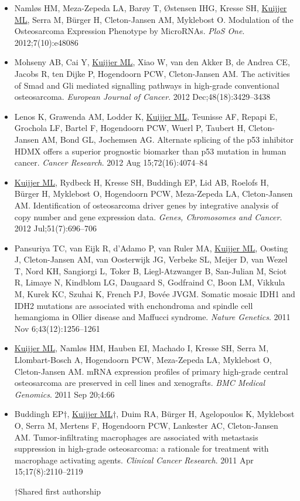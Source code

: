 \begin{itemize}
	\item Naml{\o}s HM, Meza-Zepeda LA, Bar{\o}y T, {\O}stensen IHG, Kresse SH, \underline{Kuijjer ML}, Serra M, B{\"u}rger H, Cleton-Jansen AM, Myklebost O. Modulation of the Osteosarcoma Expression Phenotype by MicroRNAs. {\it PloS One}. 2012;7(10):e48086
	\item Mohseny AB, Cai Y, \underline{Kuijjer ML}, Xiao W, van den Akker B, de Andrea CE, Jacobs R, ten Dijke P, Hogendoorn PCW, Cleton-Jansen AM. The activities of Smad and Gli mediated signalling pathways in high\hyp{}grade conventional osteosarcoma. {\it European Journal of Cancer}. 2012 Dec;48(18):3429--3438
	\item Lenos K, Grawenda AM, Lodder K, \underline{Kuijjer ML}, Teunisse AF, Repapi E, Grochola LF, Bartel F, Hogendoorn PCW, Wuerl P, Taubert H, Cleton-Jansen AM, Bond GL, Jochemsen AG. Alternate splicing of the p53 inhibitor HDMX offers a superior prognostic biomarker than p53 mutation in human cancer. {\it Cancer Research}. 2012 Aug 15;72(16):4074--84
	\item \underline{Kuijjer ML}, Rydbeck H, Kresse SH, Buddingh EP, Lid AB, Roelofs H, B{\"u}rger H, Myklebost O, Hogendoorn PCW, Meza-Zepeda LA, Cleton-Jansen AM. Identification of osteosarcoma driver genes by integrative analysis of copy number and gene expression data. {\it Genes, Chromosomes and Cancer}. 2012 Jul;51(7):696--706
	\item Pansuriya TC, van Eijk R, d'Adamo P, van Ruler MA, \underline{Kuijjer ML}, Oosting J, Cleton-Jansen AM, van Oosterwijk JG, Verbeke SL, Meijer D, van Wezel T, Nord KH, Sangiorgi L, Toker B, Liegl-Atzwanger B, San-Julian M, Sciot R, Limaye N, Kindblom LG, Daugaard S, Godfraind C, Boon LM, Vikkula M, Kurek KC, Szuhai K, French PJ, Bov{\'e}e JVGM. Somatic mosaic IDH1 and IDH2 mutations are associated with enchondroma and spindle cell hemangioma in Ollier disease and Maffucci syndrome. {\it Nature Genetics}. 2011 Nov 6;43(12):1256--1261
	\item \underline{Kuijjer ML}, Naml{\o}s HM, Hauben EI, Machado I, Kresse SH, Serra M, Llombart-Bosch A, Hogendoorn PCW, Meza-Zepeda LA, Myklebost O, Cleton-Jansen AM. mRNA expression profiles of primary high\hyp{}grade central osteosarcoma are preserved in cell lines and xenografts. {\it BMC Medical Genomics}. 2011 Sep 20;4:66
	\item Buddingh EP{\small $\dagger$}, \underline{Kuijjer ML}{\small $\dagger$}, Duim RA, B{\"u}rger H, Agelopoulos K, Myklebost O, Serra M, Mertens F, Hogendoorn PCW, Lankester AC, Cleton-Jansen AM. Tumor\hyp{}infiltrating macrophages are associated with metastasis suppression in high\hyp{}grade osteosarcoma: a rationale for treatment with macrophage activating agents. {\it Clinical Cancer Research}. 2011 Apr 15;17(8):2110--2119
\begin{small}
$\dagger$Shared first authorship
\end{small}
\end{itemize}
%
%
\newpage
\renewcommand{\chaptername}{}		%
\renewcommand{\thechapter}{}			%
